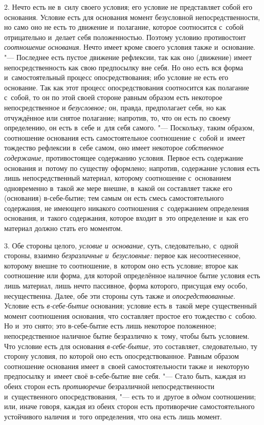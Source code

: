 2. Нечто есть не в~силу своего условия; его условие не представляет собой
его основания. Условие есть для основания момент безусловной
непосредственности, но само оно не есть то движение и~полагание, которое
соотносится с~собой отрицательно и~делает себя положенностью. Поэтому
условию противостоит {\em соотношение основания}. Нечто
имеет кроме своего условия также и~основание. "--- Последнее есть пустое
движение рефлексии, так как оно (движение) имеет непосредственность как
свою предпосылку вне себя. Но оно есть вся форма и~самостоятельный процесс
опосредствования; ибо условие не есть его основание. Так как этот процесс
опосредствования соотносится как полагание с~собой, то он по этой своей
стороне равным образом есть некоторое непосредственное и
{\em безусловное;} он, правда, предполагает себя, но
как отчуждённое или снятое полагание; напротив, то, что он есть по своему
определению, он есть в~себе и~для себя самого. "--- Поскольку, таким образом,
соотношение основания есть самостоятельное соотношение с~собой и~имеет
тождество рефлексии в~себе самом, оно имеет некоторое
{\em собственное содержание,} противостоящее содержанию
условия. Первое есть содержание основания и~потому по существу оформлено;
напротив, содержание условия есть лишь непосредственный материал, которому
соотношение с~основанием одновременно в~такой же мере внешне, в~какой он
составляет также его (основания) в-себе-бытие; тем самым он есть смесь
самостоятельного содержания, не имеющего никакого соотношения с~содержанием
определения основания, и~такого содержания, которое входит в~это
определение и~как его материал должно стать его моментом.

3. Обе стороны целого, {\em условие и~основание,} суть,
следовательно, с~одной стороны, взаимно
{\em безразличные и~безусловные:} первое как
несоотнесенное, которому внешне то соотношение, в~котором оно есть условие;
второе как соотношение или форма, для которой определённое наличное бытие
условия есть лишь материал, лишь нечто пассивное, форма которого, присущая
ему особо, несущественна. Далее, обе эти стороны суть также и
{\em опосредствованные}. Условие есть
{\em в-себе-бытие} основания; условие есть в~такой мере
существенный момент соотношения основания, что составляет простое его
тождество с~собою. Но и~это снято; это в-себе-бытие есть лишь некоторое
положенное; непосредственное наличное бытие безразлично к~тому, чтобы быть
условием. Что условие есть для основания
{\em в-себе-бытие,} это составляет, следовательно, ту
сторону условия, по которой оно есть опосредствованное. Равным образом
соотношение основания имеет в~своей самостоятельности также и~некоторую
предпосылку и~имеет своё в-себе-бытие вне себя. "--- Стало быть, каждая из
обеих сторон есть {\em противоречие} безразличной
непосредственности и~существенного опосредствования, "--- есть то и~другое в
{\em одном} соотношении; или, иначе говоря, каждая из
обеих сторон есть противоречие самостоятельного устойчивого наличия и~того
определения, что она есть лишь момент.

